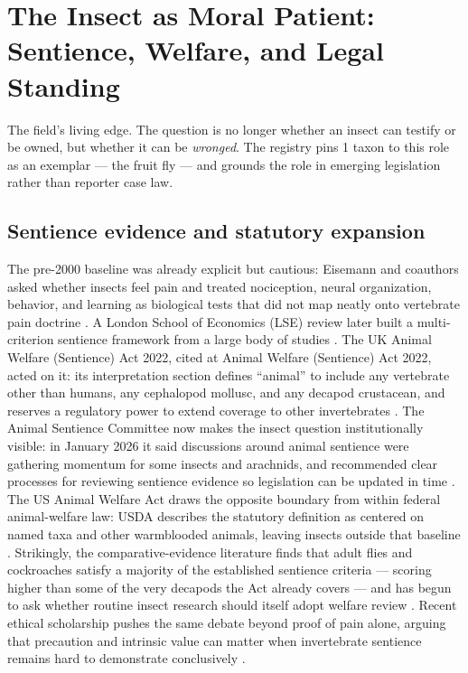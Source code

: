 \documentclass[
  english,
]{article}
\begin{document}
\newpage

\section{The Insect as Moral Patient: Sentience, Welfare, and Legal
Standing}\label{sec:welfare}

The field's living edge. The question is no longer whether an insect can
testify or be owned, but whether it can be \emph{wronged}. The registry
pins 1 taxon to this role as an exemplar --- the fruit fly --- and
grounds the role in emerging legislation rather than reporter case law.

\subsection{Sentience evidence and statutory
expansion}\label{sentience-evidence-and-statutory-expansion}

The pre-2000 baseline was already explicit but cautious: Eisemann and
coauthors asked whether insects feel pain and treated nociception,
neural organization, behavior, and learning as biological tests that did
not map neatly onto vertebrate pain doctrine
\citep{eisemann1984_insect_pain}. A London School of Economics (LSE)
review later built a multi-criterion sentience framework from a large
body of studies \citep{lse_birch2021}. The UK Animal Welfare (Sentience)
Act 2022, cited at Animal Welfare (Sentience) Act 2022, acted on it: its
interpretation section defines ``animal'' to include any vertebrate
other than humans, any cephalopod mollusc, and any decapod crustacean,
and reserves a regulatory power to extend coverage to other
invertebrates \citep{uksentience2022}. The Animal Sentience Committee
now makes the insect question institutionally visible: in January 2026
it said discussions around animal sentience were gathering momentum for
some insects and arachnids, and recommended clear processes for
reviewing sentience evidence so legislation can be updated in time
\citep{uk_asc_definitions2026}. The US Animal Welfare Act draws the
opposite boundary from within federal animal-welfare law: USDA describes
the statutory definition as centered on named taxa and other warmblooded
animals, leaving insects outside that baseline \citep{usda_awa2026}.
Strikingly, the comparative-evidence literature finds that adult flies
and cockroaches satisfy a majority of the established sentience criteria
--- scoring higher than some of the very decapods the Act already covers
--- and has begun to ask whether routine insect research should itself
adopt welfare review \citep{gibbons2022, crump2023insectwelfare}. Recent
ethical scholarship pushes the same debate beyond proof of pain alone,
arguing that precaution and intrinsic value can matter when invertebrate
sentience remains hard to demonstrate conclusively
\citep{desouzavalente2025invertebrate_sentience}.
\end{document}
